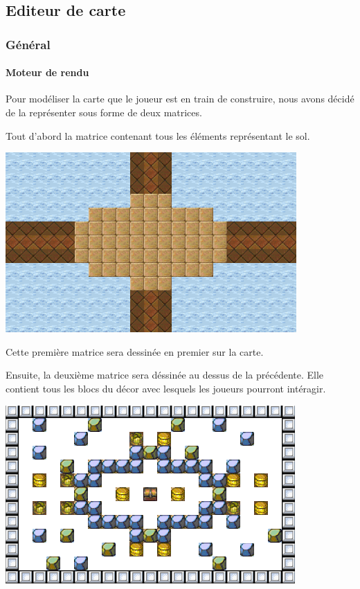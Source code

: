 			

\subsection{Editeur de carte}

	\hypertarget{Editeur de carte}{}
	\label{Editeur de carte}
	
	\subsubsection{Général}
		\paragraph{Moteur de rendu\\}
			Pour modéliser la carte que le joueur est en train de construire, nous avons décidé de la représenter sous forme de deux matrices. 
			
			Tout d'abord la matrice contenant tous les éléments représentant le sol.
			\begin{center}
				\includegraphics{./Developpement/Img/image1.png}
			\end{center}
			Cette première matrice sera dessinée en premier sur la carte.
			
			Ensuite, la deuxième matrice sera déssinée au dessus de la précédente. Elle contient tous les blocs du décor avec lesquels les joueurs pourront intéragir. 
			\begin{center}
				\includegraphics{./Developpement/Img/image2.png}
			\end{center}
			
